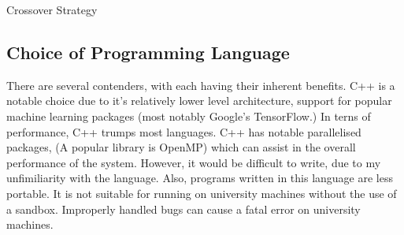 \documentclass[12pt,a4paper]{article}
\makeatletter
\def\BState{\State\hskip-\ALG@thistlm}
\makeatother
\begin{document}
    \begin{algorithm}
        \caption{Crossover Strategy}
    \end{algorithm}


\subsection*{Choice of Programming Language}

    There are several contenders, with each having their inherent benefits. C++ is a notable choice due to it's relatively lower level architecture, support for popular machine learning packages (most notably Google's TensorFlow.) In terns of performance, C++ trumps most languages. C++ has notable parallelised packages, (A popular library is OpenMP) which can assist in the overall performance of the system. However, it would be difficult to write, due to my unfimiliarity with the language. Also, programs written in this language are less portable. It is not suitable for running on university machines without the use of a sandbox. Improperly handled bugs can cause a fatal error on university machines.
\end{document}
